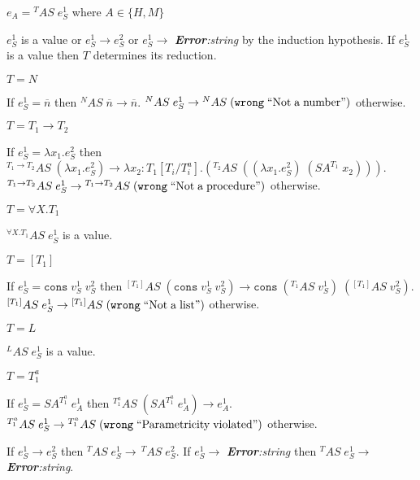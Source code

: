 \begin{case}
\label{as}
$e_{A}={^{T}A}S\;e_{S}^{1}$ where $A\in\lbrace H,M\rbrace$

$e_{S}^{1}$ is a value or $e_{S}^{1}\rightarrow e_{S}^{2}$ or $e_{S}^{1}\rightarrow$ \emph{\textbf{Error}:\;string} by the induction hypothesis.  If $e_{S}^{1}$ is a value then $T$ determines its reduction.
\begin{subcase}
$T=N$

If $e_{S}^{1}=\overline{n}$ then $^{N}AS\;\overline{n}\rightarrow\overline{n}$.  $^{N}AS\;e_{S}^{1}\rightarrow{^{N}A}S\;(\mathtt{wrong}\;\mathrm{``Not\;a\;number"})$ otherwise.
\end{subcase}
\begin{subcase}
$T=T_{1}\rightarrow T_{2}$

If $e_{S}^{1}=\lambda x_{1}.e_{S}^{2}$ then $^{T_{1}\rightarrow T_{2}}AS\;(\lambda x_{1}.e_{S}^{2})\rightarrow\lambda x_{2}:T_{1}[T_{i}/T^{a}_{i}].(^{T_{2}}AS\;((\lambda x_{1}.e_{S}^{2})\;(SA^{T_{1}}\;x_{2})))$.  $^{T_{1}\rightarrow T_{2}}AS\;e_{S}^{1}\rightarrow{^{T_{1}\rightarrow T_{2}}A}S\;(\mathtt{wrong}\;\mathrm{``Not\;a\;procedure"})$ otherwise.
\end{subcase}
\begin{subcase}
$T=\forall X.T_{1}$

$^{\forall X.T_{1}}AS\;e_{S}^{1}$ is a value.
\end{subcase}
\begin{subcase}
$T=[T_{1}]$

If $e_{S}^{1}=\mathtt{cons}\;v_{S}^{1}\;v_{S}^{2}$ then $^{[T_{1}]}AS\;(\mathtt{cons}\;v_{S}^{1}\;v_{S}^{2})\rightarrow\mathtt{cons}\;(^{T_{1}}AS\;v_{S}^{1})\;(^{[T_{1}]}AS\;v_{S}^{2})$.  $^{[T_{1}]}AS\;e_{S}^{1}\rightarrow{^{[T_{1}]}A}S\;(\mathtt{wrong}\;\mathrm{``Not\;a\;list"})$ otherwise.
\end{subcase}
\begin{subcase}
$T=L$

$^{L}AS\;e_{S}^{1}$ is a value.
\end{subcase}
\begin{subcase}
$T=T_{1}^{a}$

If $e_{S}^{1}=SA^{T_{1}^{a}}\;e_{A}^{1}$ then $^{T_{1}^{a}}AS\;(SA^{T_{1}^{a}}\;e_{A}^{1})\rightarrow e_{A}^{1}$.  $^{T_{1}^{a}}AS\;e_{S}^{1}\rightarrow{^{T_{1}^{a}}A}S\;(\mathtt{wrong}\;\mathrm{``Parametricity\;violated"})$ otherwise.
\end{subcase}
If $e_{S}^{1}\rightarrow e_{S}^{2}$ then $^{T}AS\;e_{S}^{1}\rightarrow\,^{T}AS\;e_{S}^{2}$.  If $e_{S}^{1}\rightarrow$ \emph{\textbf{Error}:\;string} then $^{T}AS\;e_{S}^{1}\rightarrow$ \emph{\textbf{Error}:\;string}.
\end{case}
